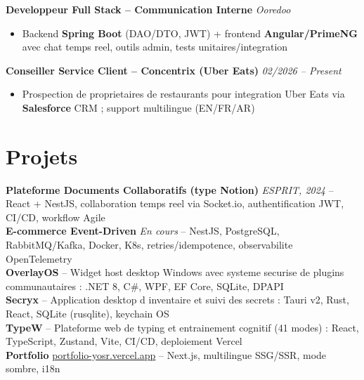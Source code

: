 \documentclass[10pt,a4paper]{article}
\begin{document}
{\vspace{2pt}
\textbf{Developpeur Full Stack -- Communication Interne} \hfill \textit{Ooredoo \;\textbar{}}
\begin{itemize}
  \item Backend \textbf{Spring Boot} (DAO/DTO, JWT) + frontend \textbf{Angular/PrimeNG} avec chat temps reel, outils admin, tests unitaires/integration
\end{itemize}

\vspace{2pt}
\textbf{Conseiller Service Client -- Concentrix (Uber Eats)} \hfill \textit{02/2026 -- Present}
\begin{itemize}
  \item Prospection de proprietaires de restaurants pour integration Uber Eats via \textbf{Salesforce} CRM ; support multilingue (EN/FR/AR)
\end{itemize}

}

\section*{Projets}
{\small

\textbf{Plateforme Documents Collaboratifs (type Notion)} \;\textbar\; \textit{ESPRIT, 2024} --
React + NestJS, collaboration temps reel via Socket.io, authentification JWT, CI/CD, workflow Agile\\[2pt]
\textbf{E-commerce Event-Driven} \;\textbar\; \textit{En cours} --
NestJS, PostgreSQL, RabbitMQ/Kafka, Docker, K8s, retries/idempotence, observabilite OpenTelemetry\\[2pt]
\textbf{OverlayOS} --
Widget host desktop Windows avec systeme securise de plugins communautaires : .NET 8, C\#, WPF, EF Core, SQLite, DPAPI\\[2pt]
\textbf{Secryx} --
Application desktop d inventaire et suivi des secrets : Tauri v2, Rust, React, SQLite (rusqlite), keychain OS\\[2pt]
\textbf{TypeW} --
Plateforme web de typing et entrainement cognitif (41 modes) : React, TypeScript, Zustand, Vite, CI/CD, deploiement Vercel\\[2pt]
\textbf{Portfolio} \;\textbar\; \href{https://portfolio-yosr.vercel.app/en}{portfolio-yosr.vercel.app} --
Next.js, multilingue SSG/SSR, mode sombre, i18n

}

\end{document}
